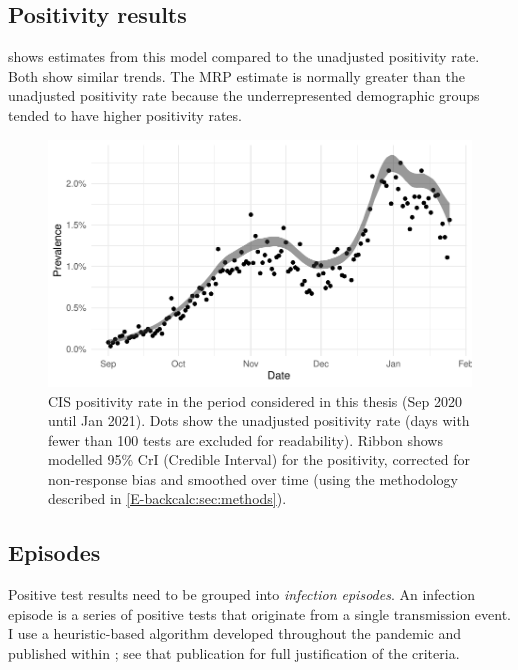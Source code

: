 \documentclass[thesis.tex]{subfiles}
\begin{document}
\subsection{Positivity results} \label{biology-data:sec:positivity-results}

 shows estimates from this model compared to the unadjusted positivity rate.
Both show similar trends.
The MRP estimate is normally greater than the unadjusted positivity rate because the underrepresented demographic groups tended to have higher positivity rates.

\begin{figure}
  \centering \includegraphics[width=\textwidth]{biology-data/CIS-positivity}
  \caption[CIS positivity]{%
    CIS positivity rate in the period considered in this thesis (Sep 2020 until Jan 2021).
    Dots show the unadjusted positivity rate (days with fewer than 100 tests are excluded for readability).
    Ribbon shows modelled 95\% CrI (Credible Interval) for the positivity, corrected for non-response bias and smoothed over time (using the methodology described in \cref{E-backcalc:sec:methods}).
  }
  \label{biology-data:fig:CIS-positivity}
\end{figure}


\subsection{Episodes} \label{biology-data:sec:cis-episodes}

Positive test results need to be grouped into \emph{infection episodes}.
An infection episode is a series of positive tests that originate from a single transmission event.
I use a heuristic-based algorithm developed throughout the pandemic and published within \textcite{weiRisk}; see that publication for full justification of the criteria.
\end{document}

